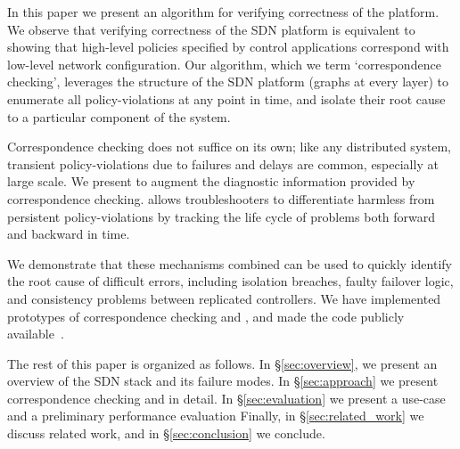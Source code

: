 In this paper we present an algorithm for verifying correctness of the
platform. We observe that verifying correctness of the SDN platform
is equivalent to showing that high-level policies specified by
control applications correspond with low-level network configuration.
Our algorithm, which we term `correspondence checking',
leverages the structure of the SDN platform (graphs at every layer)
to enumerate all policy-violations at any point in time, and isolate their
root cause to a particular component of the system.

Correspondence checking does not suffice on its own; like any distributed
system, transient policy-violations due to failures and delays are 
common, especially at large scale. We present \simulator{}
to augment the diagnostic information provided by correspondence checking.
\Simulator{} allows troubleshooters 
to differentiate harmless from persistent policy-violations by tracking the life cycle of problems 
both forward and backward in time.

We demonstrate that these mechanisms combined can be used to quickly
identify the root cause of difficult errors, including isolation breaches,
faulty failover logic, and consistency problems between replicated
controllers. We have implemented prototypes
of correspondence checking and \simulator{}, and made the code publicly
available~\cite{github}.

The rest of this paper is organized as follows. In \S\ref{sec:overview},
we present an overview of the SDN stack and its failure modes.
In \S\ref{sec:approach} we present correspondence checking and
\simulator{} in detail. In \S\ref{sec:evaluation} we present
a use-case and a preliminary performance evaluation
Finally, in \S\ref{sec:related_work} we discuss related work,
and in \S\ref{sec:conclusion} we conclude.
